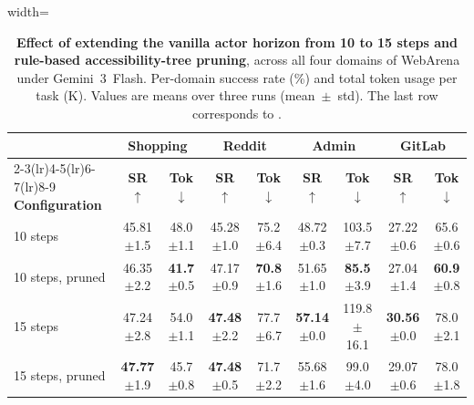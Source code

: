 \begin{table}[bt]
\centering
\begin{adjustbox}{width=\textwidth}{
\begin{tabular}{lcccccccc}
\toprule
 & \multicolumn{2}{c}{\textbf{Shopping}} & \multicolumn{2}{c}{\textbf{Reddit}} & \multicolumn{2}{c}{\textbf{Admin}} & \multicolumn{2}{c}{\textbf{GitLab}} \\
\cmidrule(lr){2-3}\cmidrule(lr){4-5}\cmidrule(lr){6-7}\cmidrule(lr){8-9}
\textbf{Configuration} & \textbf{SR $\uparrow$} & \textbf{Tok $\downarrow$} & \textbf{SR $\uparrow$} & \textbf{Tok $\downarrow$} & \textbf{SR $\uparrow$} & \textbf{Tok $\downarrow$} & \textbf{SR $\uparrow$} & \textbf{Tok $\downarrow$} \\
\midrule
10 steps         & 45.81{\scriptsize $\pm$1.5} & 48.0{\scriptsize $\pm$1.1}  & 45.28{\scriptsize $\pm$1.0} & 75.2{\scriptsize $\pm$6.4}  & 48.72{\scriptsize $\pm$0.3} & 103.5{\scriptsize $\pm$7.7}  & 27.22{\scriptsize $\pm$0.6} & 65.6{\scriptsize $\pm$0.6} \\
10 steps, pruned & 46.35{\scriptsize $\pm$2.2} & \textbf{41.7}{\scriptsize $\pm$0.5}  & 47.17{\scriptsize $\pm$0.9} & \textbf{70.8}{\scriptsize $\pm$1.6}  & 51.65{\scriptsize $\pm$1.0} & \textbf{85.5}{\scriptsize $\pm$3.9}  & 27.04{\scriptsize $\pm$1.4} & \textbf{60.9}{\scriptsize $\pm$0.8}  \\
15 steps         & 47.24{\scriptsize $\pm$2.8} & 54.0{\scriptsize $\pm$1.1}  & \textbf{47.48}{\scriptsize $\pm$2.2} & 77.7{\scriptsize $\pm$6.7}  & \textbf{57.14}{\scriptsize $\pm$0.0} & 119.8{\scriptsize $\pm$16.1} & \textbf{30.56}{\scriptsize $\pm$0.0} & 78.0{\scriptsize $\pm$2.1} \\
15 steps, pruned & \textbf{47.77}{\scriptsize $\pm$1.9} & 45.7{\scriptsize $\pm$0.8}  & \textbf{47.48}{\scriptsize $\pm$0.5} & 71.7{\scriptsize $\pm$2.2}  & 55.68{\scriptsize $\pm$1.6} & 99.0{\scriptsize $\pm$4.0}  & 29.07{\scriptsize $\pm$0.6} & 78.0{\scriptsize $\pm$1.8}  \\
\bottomrule
\end{tabular}
}\end{adjustbox}
\caption{\textbf{Effect of extending the vanilla actor horizon from 10 to 15 steps and rule-based accessibility-tree pruning}, across all four domains of WebArena under Gemini~3~Flash. Per-domain success rate (\%) and total token usage per task (K). Values are means over three runs (mean~$\pm$~{\scriptsize std}). The last row corresponds to \budgetactor{}.}
\label{tab:pruning-ablation}
\end{table}

